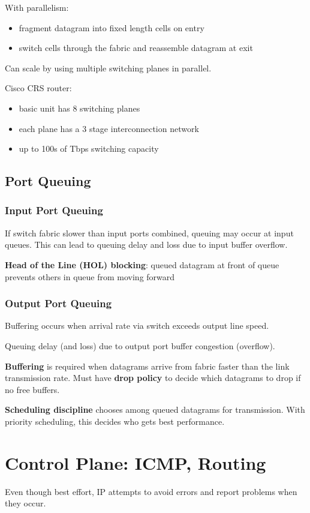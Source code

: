 \documentclass[11pt]{article}
\begin{document}
With parallelism:
\begin{itemize}
\item fragment datagram into fixed length cells on entry
\item switch cells through the fabric and reassemble datagram at exit
\end{itemize}

Can scale by using multiple switching planes in parallel.

Cisco CRS router:
\begin{itemize}
\item basic unit has 8 switching planes
\item each plane has a 3 stage interconnection network
\item up to 100s of Tbps switching capacity
\end{itemize}
\subsection{Port Queuing}
\label{sec:org303dd1e}
\subsubsection{Input Port Queuing}
\label{sec:org68946c7}
If switch fabric slower than input ports combined, queuing may occur at input queues.
This can lead to queuing delay and loss due to input buffer overflow.

\textbf{Head of the Line (HOL) blocking}: queued datagram at front of queue prevents others
in queue from moving forward
\subsubsection{Output Port Queuing}
\label{sec:org8165810}
Buffering occurs when arrival rate via switch exceeds output line speed.

Queuing delay (and loss) due to output port buffer congestion (overflow).

\textbf{Buffering} is required when datagrams arrive from fabric faster than the link
transmission rate.
Must have \textbf{drop policy} to decide which datagrams to drop if no free buffers.

\textbf{Scheduling discipline} chooses among queued datagrams for transmission.
With priority scheduling, this decides who gets best performance.
\section{Control Plane: ICMP, Routing}
\label{sec:org1f6e40d}
Even though best effort, IP attempts to avoid errors and report problems when they
occur.
\end{document}
